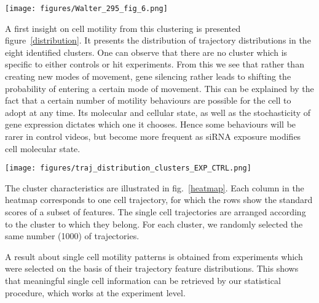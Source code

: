\begin{figure*}[!ht]
\centerline{\texttt{[image: figures/Walter\_295\_fig\_6.png]}}
\caption{Evaluation of k-means clustering quality as a function of the number of clusters (average and standard deviation on 10 algorithm initializations). The same protocol was applied to a subset of the Mitocheck dataset, and two samples of the same dimensions, respectively drawn from the Uniform and the Normal distributions. }
\label{clusterscore}
\end{figure*}

A first insight on cell motility from this clustering is presented
figure~\ref{distribution}. It presents the distribution of trajectory
distributions in the eight identified clusters. One can observe that
there are no cluster which is specific to either controls or
hit experiments. From this we see that rather than creating new
modes of movement, gene silencing rather leads to shifting the probability of entering a certain mode of movement. 
This can be
explained by the fact that a certain number of motility behaviours are
possible for the cell to adopt at any time. Its molecular and cellular state, as well as the
stochasticity of gene expression dictates which one it chooses. Hence some behaviours will be rarer
in control videos, but become more frequent as siRNA exposure modifies cell molecular state. 

\begin{figure*}[!ht]
\centering
\texttt{[image: figures/traj\_distribution\_clusters\_EXP\_CTRL.png]}
\caption{Comparison of cluster distributions between controls (Ctrl) and experiments (Exp) for the eight trajectory clusters which were identified in the Mitocheck dataset. The clusters are in the same order as in figure ~\ref{heatmap}.}
\label{distribution}
\end{figure*}
 
The cluster characteristics are illustrated in fig.~\ref{heatmap}. Each
column in the heatmap corresponds to one cell trajectory, for which
the rows show the standard scores of a subset of features. The single
cell trajectories are arranged according to the cluster to which they
belong. For each cluster, we randomly selected the same number (1000) of
trajectories. 

A result about single cell motility patterns is obtained from
experiments which were selected on the basis of their trajectory
feature distributions. This shows that meaningful single cell
information can be retrieved by our statistical procedure, which works
at the experiment level. 

